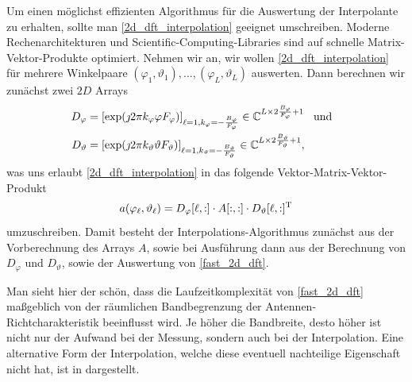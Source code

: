 Um einen m\"oglichst effizienten Algorithmus f\"ur die Auswertung der Interpolante zu erhalten, sollte man \eqref{2d_dft_interpolation} geeignet umschreiben. Moderne Rechenarchitekturen und Scientific-Computing-Libraries sind auf schnelle Matrix-Vektor-Produkte optimiert. Nehmen wir an, wir wollen \eqref{2d_dft_interpolation} f\"ur mehrere Winkelpaare $(\varphi_1, \vartheta_1), \dots, (\varphi_L, \vartheta_L)$ auswerten. Dann berechnen wir zun\"achst zwei $2D$ Arrays
\begin{align}
    D_\varphi &= [\exp(\jmath 2 \pi k_\varphi \varphi F_\varphi)]_{\ell = 1, k_\varphi=-\frac{B_\varphi}{F_\varphi}} \in \mathbb{C}^{L \times 2 \frac{B_\varphi}{F_\varphi} + 1} {\hspace{3mm} \text{und} \hspace{3mm}}\\
    D_\vartheta &= [\exp(\jmath 2 \pi k_\vartheta \vartheta F_\vartheta)]_{\ell = 1, k_\vartheta=-\frac{B_\vartheta}{F_\vartheta}} \in \mathbb{C}^{L \times 2 \frac{B_\vartheta}{F_\vartheta} + 1}, 
\end{align}
was uns erlaubt \eqref{2d_dft_interpolation} in das folgende Vektor-Matrix-Vektor-Produkt
\begin{equation}\label{fast_2d_dft}
    a(\varphi_\ell, \vartheta_\ell) = 
        D_\varphi[\ell, :] \cdot A[:,:] \cdot D_\vartheta[\ell, :]^{\mathrm{T}}
\end{equation}
umzuschreiben. Damit besteht der Interpolations-Algorithmus zun\"achst aus der Vorberechnung des Arrays $A$, sowie bei Ausf\"uhrung dann aus der Berechnung von $D_\varphi$ und $D_\vartheta$, sowie der Auswertung von \eqref{fast_2d_dft}.

Man sieht hier der sch\"on, dass die Laufzeitkomplexit\"at von \eqref{fast_2d_dft} ma{\ss}geblich von der r\"aumlichen Bandbegrenzung der Antennen-Richtcharakteristik beeinflusst wird. Je h\"oher die Bandbreite, desto h\"oher ist nicht nur der Aufwand bei der Messung, sondern auch bei der Interpolation. Eine alternative Form der Interpolation, welche diese eventuell nachteilige Eigenschaft nicht hat, ist in  dargestellt.
